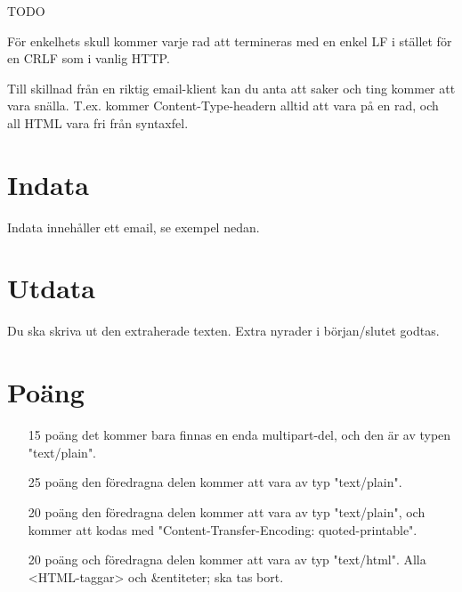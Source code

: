 
TODO

För enkelhets skull kommer varje rad att termineras med en enkel LF i stället för en CRLF som i vanlig HTTP.

Till skillnad från en riktig email-klient kan du anta att saker och ting kommer att vara snälla.
T.ex. kommer Content-Type-headern alltid att vara på en rad, och all HTML vara fri från syntaxfel.

\section*{Indata}
Indata innehåller ett email, se exempel nedan.

\section*{Utdata}
Du ska skriva ut den extraherade texten. Extra nyrader i början/slutet godtas.

\section*{Poäng}

\begin{enumerate}
	\item[15 poäng] det kommer bara finnas en enda multipart-del, och den är av typen "text/plain".
	\item[25 poäng] den föredragna delen kommer att vara av typ "text/plain".
	\item[20 poäng] den föredragna delen kommer att vara av typ "text/plain", och kommer att kodas med "Content-Transfer-Encoding: quoted-printable".
  \item[20 poäng] och föredragna delen kommer att vara av typ "text/html". Alla <HTML-taggar> och &entiteter; ska tas bort.
\end{enumerate}
